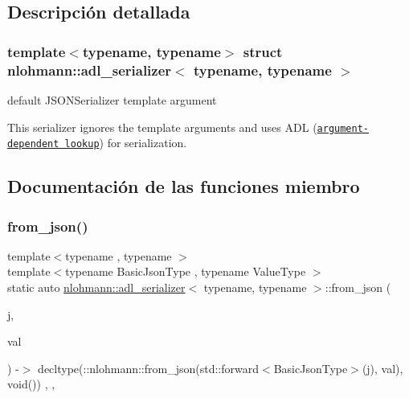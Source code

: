 \subsection{Descripción detallada}
\subsubsection*{template$<$typename, typename$>$\newline
struct nlohmann\+::adl\+\_\+serializer$<$ typename, typename $>$}

default J\+S\+O\+N\+Serializer template argument 

This serializer ignores the template arguments and uses A\+DL (\href{https://en.cppreference.com/w/cpp/language/adl}{\tt argument-\/dependent lookup}) for serialization. 

\subsection{Documentación de las funciones miembro}
\mbox{\label{structnlohmann_1_1adl__serializer_a2c544585b8b1828a0f1eecd831d0496e}} 
\subsubsection{\texorpdfstring{from\+\_\+json()}{from\_json()}}
{\footnotesize\ttfamily template$<$typename , typename $>$ \\
template$<$typename Basic\+Json\+Type , typename Value\+Type $>$ \\
static auto \mbox{\hyperlink{structnlohmann_1_1adl__serializer}{nlohmann\+::adl\+\_\+serializer}}$<$ typename, typename $>$\+::from\+\_\+json (\begin{DoxyParamCaption}\item[{Basic\+Json\+Type \&\&}]{j,  }\item[{Value\+Type \&}]{val }\end{DoxyParamCaption}) -\/$>$ decltype(\+::nlohmann\+::from\+\_\+json(std\+::forward$<$Basic\+Json\+Type$>$(j), val), void())
    \hspace{0.3cm}{\ttfamily [inline]}, {\ttfamily [static]}, {\ttfamily [noexcept]}}



